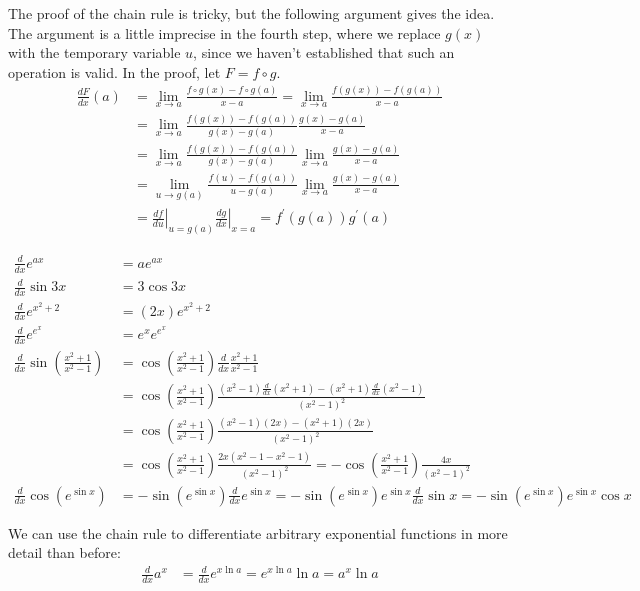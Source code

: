 \documentclass[fleqn]{report}
\begin{document}
The proof of the chain rule is tricky, but the following
argument gives the idea. The argument is a little imprecise
in the fourth step, where we replace $g(x)$ with the temporary
variable $u$, since we haven't established that such an
operation is valid. In the proof, let $F = f \circ g$.
\begin{align*}
\frac{dF}{dx}(a) & = \lim_{x \rightarrow a} \frac{f \circ g (x)
- f \circ g(a)}{x-a} = \lim_{x \rightarrow a} \frac{f(g(x)) -
 f(g(a))}{x-a} \\
& = \lim_{x \rightarrow a} \frac{f(g(x)) - f(g(a))}{g(x) - g(a)}
\frac{g(x) - g(a)}{x-a}\\
& = \lim_{x \rightarrow a} \frac{f(g(x)) - f(g(a))}{g(x) - g(a)}
\lim_{x \rightarrow a} \frac{g(x) - g(a)}{x-a} \\
& = \lim_{u \rightarrow g(a)} \frac{f(u) - f(g(a))}{u - g(a)}
\lim_{x \rightarrow a} \frac{g(x) - g(a)}{x-a} \\
& = \left. \frac{df}{du} \right|_{u=g(a)} \left.
\frac{dg}{dx} \right|_{x=a} = f^\prime(g(a)) g^\prime(a)
\end{align*}

\begin{example}
\begin{align*}
\frac{d}{dx} e^{ax} & = ae^{ax} \\
\frac{d}{dx} \sin 3x & = 3 \cos 3x \\
\frac{d}{dx} e^{x^2+2} & = (2x) e^{x^2+2} \\
\frac{d}{dx} e^{e^x} & = e^x e^{e^x} \\
\frac{d}{dx} \sin \left( \frac{x^2+1}{x^2-1} \right) & = \cos
\left( \frac{x^2+1}{x^2-1} \right) \frac{d}{dx}
\frac{x^2+1}{x^2-1} \\
& = \cos \left( \frac{x^2+1}{x^2-1} \right) \frac{(x^2-1)
\frac{d}{dx} (x^2+1) - (x^2+1) \frac{d}{dx} (x^2-1)}{(x^2-1)^2} \\
& = \cos \left( \frac{x^2+1}{x^2-1} \right) \frac{(x^2-1)
(2x) - (x^2+1) (2x)}{(x^2-1)^2} \\
& = \cos \left( \frac{x^2+1}{x^2-1} \right) \frac{2x(x^2-1 - x^2
-1)}{(x^2-1)^2} = - \cos \left( \frac{x^2+1}{x^2-1} \right) 
\frac{4x}{(x^2-1)^2} \\
\frac{d}{dx} \cos ( e^{\sin x}) & = -\sin (e^{\sin x})
\frac{d}{dx} e^{\sin x} = -\sin (e^{\sin x}) e^{\sin x}
\frac{d}{dx} \sin x = -\sin (e^{\sin x}) e^{\sin x} \cos x 
\end{align*}
\end{example}

\begin{example}
We can use the chain rule to differentiate
arbitrary exponential functions in more detail than before:
\begin{align*}
\frac{d}{dx} a^x& = \frac{d}{dx} e^{x\ln a} = e^{x \ln a} \ln a =
a^x \ln a 
\end{align*}
\end{example}
\clearpage
\end{document}
